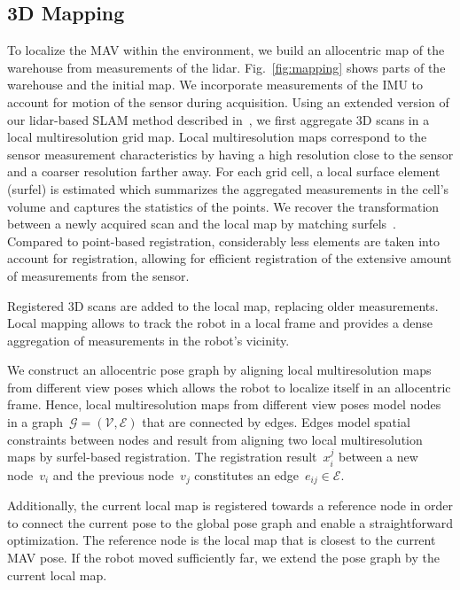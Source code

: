 \subsection{3D Mapping}
\label{sec:3D_Mapping}
To localize the MAV within the environment, we build an allocentric map of the warehouse from measurements of the lidar. Fig.~\ref{fig:mapping} shows parts of the warehouse and the initial map.
We incorporate measurements of the IMU to account for motion of the sensor during acquisition.
Using an extended version of our lidar-based SLAM method described in~\cite{Droeschel2017104}, we first aggregate 3D scans in a local multiresolution grid map.
Local multiresolution maps correspond to the sensor measurement characteristics by having a high resolution close to the sensor and a coarser resolution farther away. 
For each grid cell, a local surface element (surfel) is estimated which summarizes the aggregated measurements in the cell's volume and captures the statistics of the points.
We recover the transformation between a newly acquired scan and the local map by matching surfels~\cite{Droeschel:ICRA2014}. 
Compared to point-based registration, considerably less elements are taken into account for registration, allowing for efficient registration of the extensive amount of measurements from the sensor. 

Registered 3D scans are added to the local map, replacing older measurements. 
Local mapping allows to track the robot in a local frame and provides a dense aggregation of measurements in the robot's vicinity. 

We construct an allocentric pose graph by aligning local multiresolution maps from different view poses which allows the robot to localize itself in an allocentric frame. Hence, local multiresolution maps from different view poses model nodes in a graph~$\mathcal{G} = ( \mathcal{V}, \mathcal{E} )$ that are connected by edges.
Edges model spatial constraints between nodes and result from aligning two local multiresolution maps by surfel-based registration.
The registration result~$x_i^j$ between a new node~$v_i$ and the previous node~$v_j$ constitutes an edge~$e_{ij} \in \mathcal{E}$.

Additionally, the current local map is registered towards a reference node in order to connect the current pose to the global pose graph and enable a straightforward optimization.
The reference node is the local map that is closest to the current MAV pose.
If the robot moved sufficiently far, we extend the pose graph by the current local map.

